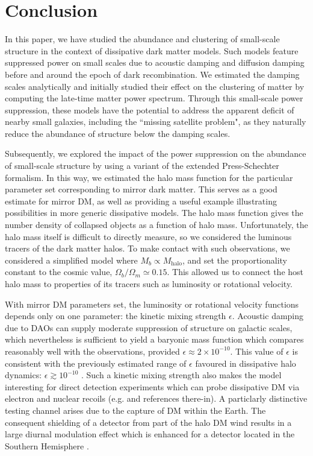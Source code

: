 \documentclass[12pt]{article}
\begin{document}
\section{Conclusion}
\label{conclusion}

In this paper, we have studied the abundance and clustering of small-scale structure in the context of dissipative dark matter models. 
Such models feature suppressed power on small scales due to acoustic damping and diffusion damping before and around the epoch of 
dark recombination. We estimated the damping scales analytically and initially studied their effect on the clustering of matter by computing the 
late-time matter power spectrum. Through this small-scale power suppression, these models have the potential to 
address the apparent deficit of nearby small galaxies, including the ``missing satellite problem", as they naturally 
reduce the abundance of structure below the damping scales.

Subsequently, we explored the impact of the power suppression on the abundance of small-scale structure by using a 
variant of the extended Press-Schechter formalism. In this way, we estimated the halo mass function for the particular parameter set corresponding 
to mirror dark matter. This serves as a good estimate for mirror DM, as well as providing a  useful  example illustrating possibilities in 
more generic dissipative models. The halo mass function gives the number density of collapsed objects as a function of halo mass. 
Unfortunately, the halo mass itself is difficult to directly measure, so we considered the luminous tracers 
of the dark matter halos. To make contact with such observations, we considered a simplified model where $M_b \propto M_{\text{halo}}$, 
and set the proportionality constant to the cosmic value, $\Omega_b/\Omega_m \simeq 0.15$. This allowed us to connect the host 
halo mass to properties of its tracers such as luminosity or rotational velocity.

With mirror DM parameters set, the luminosity or rotational velocity functions depends only on one parameter: the kinetic 
mixing strength $\epsilon$. Acoustic damping due to DAOs can supply moderate suppression of structure on galactic scales, which 
nevertheless is sufficient to yield a baryonic mass function which compares reasonably well with the observations, 
provided $\epsilon \approx 2 \times 10^{-10}$. This value of $\epsilon$ is consistent with the previously estimated range of $\epsilon$ favoured 
in dissipative halo dynamics: $\epsilon \gtrsim 10^{-10}$ \cite{sph,footexploredb,rich8}. Such a kinetic mixing strength also makes the 
model interesting for direct detection experiments which can probe dissipative DM via electron and nuclear recoils 
(e.g. \cite{jackson} and references there-in). A particlarly distinctive testing channel arises due to the
capture of DM within the 
Earth. The consequent shielding of a detector from part of the halo DM wind results in  a large diurnal modulation effect 
which is enhanced for a 
detector located in the Southern Hemisphere
\cite{footdiurnal,diurnal,jackson}.
\end{document}
